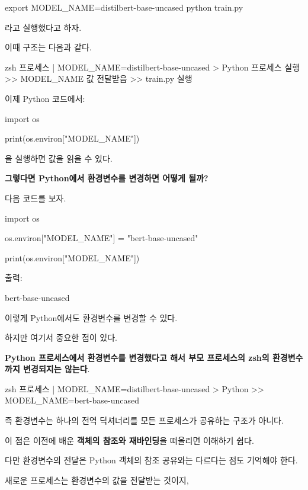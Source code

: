\begin{dhkzsh}
export MODEL_NAME=distilbert-base-uncased
python train.py
\end{dhkzsh}

라고 실행했다고 하자.

이때 구조는 다음과 같다.

\begin{dhkdir}[in=6]
zsh 프로세스
| MODEL_NAME=distilbert-base-uncased
> Python 프로세스 실행
>> MODEL_NAME 값 전달받음
>> train.py 실행
\end{dhkdir}

이제 Python 코드에서:

\begin{dhkcode}
import os

print(os.environ["MODEL_NAME"])
\end{dhkcode}

을 실행하면 값을 읽을 수 있다.

\textbf{그렇다면 Python에서 환경변수를 변경하면 어떻게 될까?}

다음 코드를 보자.

\begin{dhkcode}
import os

os.environ["MODEL_NAME"] = "bert-base-uncased"

print(os.environ["MODEL_NAME"])
\end{dhkcode}

출력:

\begin{dhkzsh}
bert-base-uncased
\end{dhkzsh}

이렇게 Python에서도 환경변수를 변경할 수 있다.

하지만 여기서 중요한 점이 있다.

\textbf{Python 프로세스에서 환경변수를 변경했다고 해서 부모 프로세스의 zsh의 환경변수까지 변경되지는 않는다}.

\begin{dhkdir}[in=6]
zsh 프로세스
| MODEL_NAME=distilbert-base-uncased
> Python
>> MODEL_NAME=bert-base-uncased
\end{dhkdir}

즉 환경변수는 하나의 전역 딕셔너리를 모든 프로세스가 공유하는 구조가 아니다.

이 점은 이전에 배운 \textbf{객체의 참조와 재바인딩}을 떠올리면 이해하기 쉽다.

다만 환경변수의 전달은 Python 객체의 참조 공유와는 다르다는 점도 기억해야 한다.

새로운 프로세스는 환경변수의 값을 전달받는 것이지,


